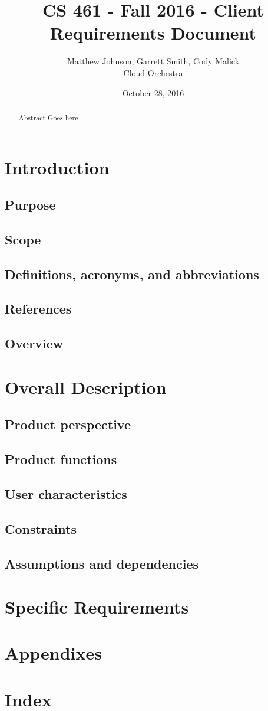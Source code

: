 \documentclass[10pt,letterpaper,onecolumn,draftclsnofoot]{IEEEtran}
\begin{document}
\begin{titlepage}
  \title{CS 461 - Fall 2016 - Client Requirements Document}
  \author{Matthew Johnson, Garrett Smith, Cody Malick\\Cloud Orchestra}
  \date{October 28, 2016}
  \maketitle
  \vspace{4cm}
  \begin{abstract}
  	\noindent Abstract Goes here

  \end{abstract}

\end{titlepage}
\tableofcontents
\clearpage
\section{Introduction}
\subsection{Purpose}
\subsection{Scope}
\subsection{Definitions, acronyms, and abbreviations}
\subsection{References}
\subsection{Overview}
\section{Overall Description}
\subsection{Product perspective}
\subsection{Product functions}
\subsection{User characteristics}
\subsection{Constraints}
\subsection{Assumptions and dependencies}
\section{Specific Requirements}
\section{Appendixes}
\section{Index}
\end{document}
